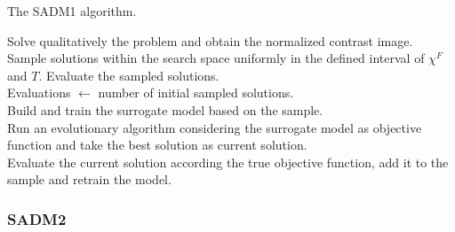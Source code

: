 				\begin{algorithm}[!h]
					\caption[Explanation of the functioning of the SADM1 algorithm.]{The SADM1 algorithm.}
					\label{alg:sadm1}
					Solve qualitatively the problem and obtain the normalized contrast image.\\
					Sample solutions within the search space uniformly in the defined interval of $\chi^F$ and $T$.
					Evaluate the sampled solutions.\\
					Evaluations $\leftarrow$ number of initial sampled solutions.\\
					Build and train the surrogate model based on the sample.\\
					Run an evolutionary algorithm considering the surrogate model as objective function and take the best solution as current solution.\\
					Evaluate the current solution according the true objective function, add it to the sample and retrain the model.\\
				\end{algorithm}
	
			\subsubsection{SADM2}\label{chap:proposed-methodology:surrogate:algorithms:sadm2}
			
